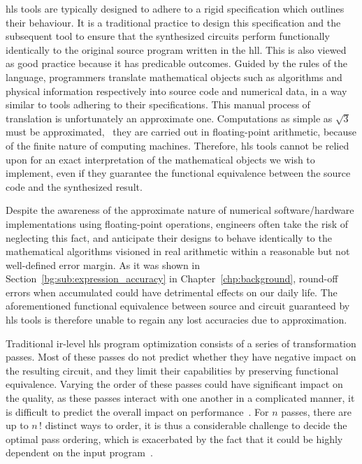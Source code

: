 \Gls{hls} tools are typically designed to adhere to a rigid specification
which outlines their behaviour.  It is a traditional practice to design
this specification and the subsequent tool to ensure that the synthesized
circuits perform functionally identically to the original source program
written in the \gls{hll}.  This is also viewed as good practice because it
has predicable outcomes.  Guided by the rules of the language, programmers
translate mathematical objects such as algorithms and physical information
respectively into source code and numerical data, in a way similar to tools
adhering to their specifications.  This manual process of translation is
unfortunately an approximate one.  Computations as simple as $\sqrt{3}$ must be
approximated, \eg~they are carried out in floating-point arithmetic, because of
the finite nature of computing machines.  Therefore, \gls{hls} tools cannot be
relied upon for an exact interpretation of the mathematical objects we wish to
implement, even if they guarantee the functional equivalence between the source
code and the synthesized result.

Despite the awareness of the approximate nature of numerical software/hardware
implementations using floating-point operations, engineers often take
the risk of neglecting this fact, and anticipate their designs to behave
identically to the mathematical algorithms visioned in real arithmetic
within a reasonable but not well-defined error margin.  As it was shown in
Section~\ref{bg:sub:expression_accuracy} in Chapter~\ref{chp:background},
round-off errors when accumulated could have detrimental effects on our daily
life.  The aforementioned functional equivalence between source and circuit
guaranteed by \gls{hls} tools is therefore unable to regain any lost accuracies
due to approximation.

Traditional \gls{ir}-level \gls{hls} program optimization consists of a
series of transformation passes.  Most of these passes do not predict whether
they have negative impact on the resulting circuit, and they limit their
capabilities by preserving functional equivalence.  Varying the order of these
passes could have significant impact on the quality, as these passes interact
with one another in a complicated manner, it is difficult to predict the
overall impact on performance~\cite{huang15}.  For $n$ passes, there are up to
$n{\,!}$ distinct ways to order, it is thus a considerable challenge to decide
the optimal pass ordering, which is exacerbated by the fact that it could be
highly dependent on the input program~\cite{cong13}.


